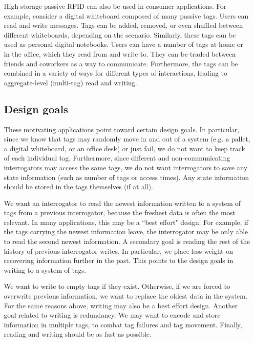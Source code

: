 \documentclass[conference]{IEEEtran}
\begin{document}
High storage passive RFID can also be used in consumer applications.  For example, consider a digital whiteboard composed of many passive tags.  Users can read and write messages.  Tags can be added, removed, or even shuffled between different whiteboards, depending on the scenario.  Similarly, these tags can be used as personal digital notebooks.  Users can have a number of tags at home or in the office, which they read from and write to.  They can be traded between friends and coworkers as a way to communicate.  Furthermore, the tags can be combined in a variety of ways for different types of interactions, leading to aggregate-level (multi-tag) read and writing.

\subsection{Design goals}
These motivating applications point toward certain design goals.  In particular, since we know that tags may randomly move in and out of a system (e.g. a pallet, a digital whiteboard, or an office desk) or just fail, we do not want to keep track of each individual tag.  Furthermore, since different and non-communicating interrogators may access the same tags, we do not want interrogators to save any state information (such as number of tags or access times).  Any state information should be stored in the tags themselves (if at all).

We want an interrogator to read the newest information written to a system of tags from a previous interrogator, because the freshest data is often the most relevant.  In many applications, this may be a ``best effort" design.  For example, if the tags carrying the newest information leave, the interrogator may be only able to read the second newest information.  A secondary goal is reading the rest of the history of previous interrogator writes.  In particular, we place less weight on recovering information further in the past.  This points to the design goals in writing to a system of tags.  

We want to write to empty tags if they exist.  Otherwise, if we are forced to overwrite previous information, we want to replace the oldest data in the system.  For the same reasons above, writing may also be a best effort design.  Another goal related to writing is redundancy.  We may want to encode and store information in multiple tags, to combat tag failures and tag movement.  Finally, reading and writing should be as fast as possible.  
\end{document}
